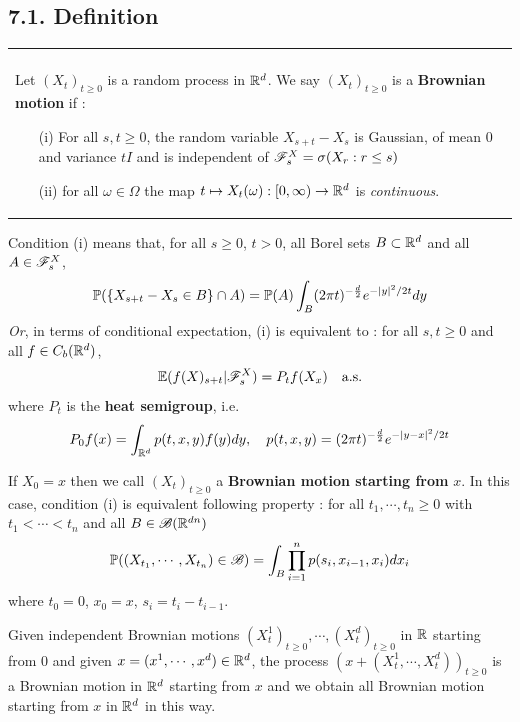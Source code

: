 \documentclass[12pt,a4paper]{report}
\begin{document}
\subsection*{7.1. Definition}

\begin{tabular}{|p{}|}
\hline \\
Let $(X_t)_{t\geq 0}$ is a random process in $\mathbb{R}^d$. We say $(X_t)_{t\geq 0}$ is a \textbf{Brownian motion} if :
\begin{itemize}
\item[(i)] For all $s,t\geq 0$, the random variable $X_{s+t}-X_s$ is Gaussian, of mean 0 and variance $tI$ and is independent of $\mathscr{F}_s^X = \sigma(X_r : r\leq s)$
\item[(ii)] for all $\omega \in \Omega$ the map $t\mapsto X_{t} (\omega) : [0,\infty ) \rightarrow \mathbb{R}^d$ is \emph{continuous}.
\end{itemize}
\\ \hline
\end{tabular}
\s

Condition (i) means that, for all $s\geq 0$, $t>0$, all Borel sets $B\subset \mathbb{R}^d$ and all $A \in \mathscr{F}_s^X$,
\begin{align*}
\mathbb{P}( \{ X_{s+t} - X_s \in B \} \cap A ) = \mathbb{P}(A) \int_B (2\pi t)^{-\frac{d}{2}} e^{-|y|^2/2t} dy
\end{align*}
\emph{Or}, in terms of conditional expectation, (i) is equivalent to : for all $s,t \geq 0$ and all $f\in C_b (\mathbb{R}^d)$,
\begin{align*}
\mathbb{E} (f(X)_{s+t} | \mathscr{F}^X_s) = P_t f(X_x) \quad \text{a.s.} 
\end{align*}
where $P_t$ is the \textbf{heat semigroup}, i.e. 
\begin{align*}
P_0 f(x) = \int_{\mathbb{R}^d} p(t,x,y)f(y)dy, \quad p(t,x,y) = (2\pi t)^{-\frac{d}{2}}  e^{-|y-x|^2/2t}
\end{align*}
\s

If $X_0 =x$ then we call $(X_t)_{t\geq 0}$ a \textbf{Brownian motion starting from} $x$. In this case, condition (i) is equivalent following property : for all $t_1, \cdots, t_n \geq 0$ with $t_1 < \cdots < t_n$ and all $B \in \mathscr{B}(\mathbb{R}^{dn})$
\begin{align*}
\mathbb{P}( (X_{t_1},\cdots, X_{t_n}) \in \mathscr{B}  ) = \int_B \prod_{i=1}^n p(s_i, x_{i-1},x_i) dx_i
\end{align*}
where $t_0 =0$, $x_0=x$, $s_i = t_i-t_{i-1}$.
\s

Given independent Brownian motions $(X^1_t)_{t\geq 0},\cdots, (X_t^d)_{t\geq 0}$ in $\mathbb{R}$ starting from $0$ and given $x=(x^1, \cdots, x^d) \in \mathbb{R}^d$, the process $(x + (X_t^1, \cdots, X_t^d))_{t\geq 0}$ is a Brownian motion in $\mathbb{R}^d$ starting from $x$ and we obtain all Brownian motion starting from $x$ in $\mathbb{R}^d$ in this way.
\s
\end{document}
